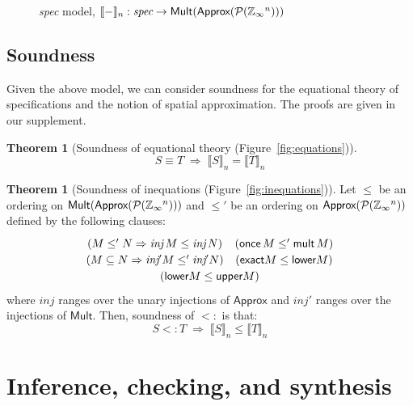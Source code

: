 \documentclass[9pt]{sigplanconf}
\newcounter{block}
\theoremstyle{definition}
\newtheorem{theorem}[block]{Theorem}
\newcommand{\interp}[1]{\llbracket{#1}\rrbracket}
\begin{document}
\begin{figure}
\vspace{-0.5em}

\caption{\textit{spec} model,
$\interp{-}_n : \textit{spec} \rightarrow \textsf{Mult}(\textsf{Approx}(\mathcal{P}(\domainVal{}^n)))$}
\label{fig:spatial-model}
\vspace{-0.75em}
\end{figure}

\subsection{Soundness}
%
Given the above model, we can
consider soundness for the equational theory of
specifications and the notion of spatial approximation. The proofs are given in our supplement.

\begin{theorem}[Soundness of equational theory (Figure~\ref{fig:equations})]
\[
S \equiv T \; \Rightarrow \;
\interp{S}_n = \interp{T}_n
\]
\end{theorem}

\begin{theorem}[Soundness of inequations
  (Figure~\ref{fig:inequations})] 

Let $\leq$ be an ordering on
$\textsf{Mult}(\textsf{Approx}(\mathcal{P}(\mathbb{Z}_\infty{}^n)))$
and $\leq'$ be an ordering on
$\textsf{Approx}(\mathcal{P}(\mathbb{Z}_\infty{}^n))$ defined by the
following clauses:
\begin{align*}
\def\arraystretch{1.2}
\begin{array}{c}
\begin{array}{cc}
(M \leq' N \Rightarrow \textit{inj} \, M \leq \textit{inj} \, N) &
(\textsf{once} \, M \leq' \textsf{mult} \, M) \\
(M \subseteq N \Rightarrow \textit{inj}' M \leq' \textit{inj}' N)
& (\textsf{exact} M \leq  \textsf{lower} M)
\end{array} \\ 
(\textsf{lower} M \leq  \textsf{upper} M)
\end{array}
\end{align*}
where $\textit{inj}$ ranges over the unary injections
of $\textsf{Approx}$ and $\textit{inj}'$ ranges over the injections of
$\textsf{Mult}$. Then, soundness of $<:$ is that:
\[
S <: T
\; \Rightarrow \;
\interp{S}_n \leq \interp{T}_n
\]
\end{theorem}

\section{Inference, checking, and synthesis}
\label{sec:analysis}
\end{document}
